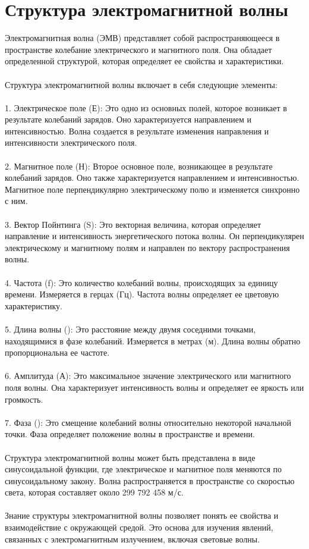 \documentclass{article}
\begin{document}
\section{Структура электромагнитной волны}
Электромагнитная волна (ЭМВ) представляет собой распространяющееся в пространстве колебание электрического и магнитного поля. Она обладает определенной структурой, которая определяет ее свойства и характеристики.\\
~\\
Структура электромагнитной волны включает в себя следующие элементы:\\
~\\
1. Электрическое поле (Е): Это одно из основных полей, которое возникает в результате колебаний зарядов. Оно характеризуется направлением и интенсивностью. Волна создается в результате изменения направления и интенсивности электрического поля.\\
~\\
2. Магнитное поле (Н): Второе основное поле, возникающее в результате колебаний зарядов. Оно также характеризуется направлением и интенсивностью. Магнитное поле перпендикулярно электрическому полю и изменяется синхронно с ним.\\
~\\
3. Вектор Пойнтинга (S): Это векторная величина, которая определяет направление и интенсивность энергетического потока волны. Он перпендикулярен электрическому и магнитному полям и направлен по вектору распространения волны.\\
~\\
4. Частота (f): Это количество колебаний волны, происходящих за единицу времени. Измеряется в герцах (Гц). Частота волны определяет ее цветовую характеристику.\\
~\\
5. Длина волны (): Это расстояние между двумя соседними точками, находящимися в фазе колебаний. Измеряется в метрах (м). Длина волны обратно пропорциональна ее частоте.\\
~\\
6. Амплитуда (А): Это максимальное значение электрического или магнитного поля волны. Она характеризует интенсивность волны и определяет ее яркость или громкость.\\
~\\
7. Фаза (): Это смещение колебаний волны относительно некоторой начальной точки. Фаза определяет положение волны в пространстве и времени.\\
~\\
Структура электромагнитной волны может быть представлена в виде синусоидальной функции, где электрическое и магнитное поля меняются по синусоидальному закону. Волна распространяется в пространстве со скоростью света, которая составляет около 299 792 458 м/с.\\
~\\
Знание структуры электромагнитной волны позволяет понять ее свойства и взаимодействие с окружающей средой. Это основа для изучения явлений, связанных с электромагнитным излучением, включая световые волны.
\end{document}
